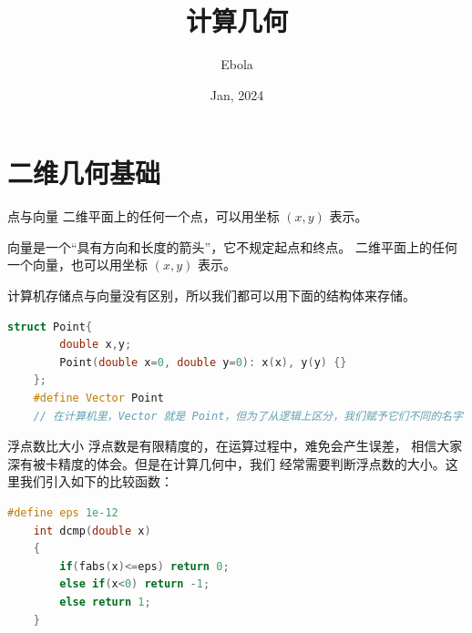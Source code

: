 \documentclass{beamer}
\author{Ebola}
\title{计算几何}
\institute{
    Institute of Mathematics, \\
    Zhejiang University.
}
\date{Jan, 2024}
\begin{document}
\begin{frame}
    \titlepage
\end{frame}

\begin{frame}
    \tableofcontents[sectionstyle=show,subsectionstyle=show/shaded/hide,subsubsectionstyle=show/shaded/hide]
\end{frame}

\section{二维几何基础}

\begin{frame}[fragile]{点与向量}
    二维平面上的任何一个点，可以用坐标 $(x,y)$ 表示。
    \vspace{1em}

    \pause
    向量是一个“具有方向和长度的箭头”，它不规定起点和终点。
    二维平面上的任何一个向量，也可以用坐标 $(x,y)$ 表示。
    \vspace{1em}

    \pause
    计算机存储点与向量没有区别，所以我们都可以用下面的结构体来存储。
\begin{lstlisting}[language=c++]
    struct Point{
        double x,y;
        Point(double x=0, double y=0): x(x), y(y) {}
    };
    #define Vector Point
    // 在计算机里，Vector 就是 Point，但为了从逻辑上区分，我们赋予它们不同的名字
\end{lstlisting}
\end{frame}


\begin{frame}[fragile]{浮点数比大小}
    \small
    浮点数是有限精度的，在运算过程中，难免会产生误差，
    相信大家深有被卡精度的体会。但是在计算几何中，我们
    经常需要判断浮点数的大小。\pause 这里我们引入如下的比较函数：
\begin{lstlisting}[language=c++]
    #define eps 1e-12
    int dcmp(double x)
    {
        if(fabs(x)<=eps) return 0;
        else if(x<0) return -1;
        else return 1;
    }
\end{lstlisting}
\end{frame}
\end{document}
